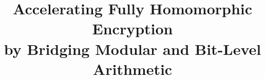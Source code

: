 







\title[Accelerating Fully Homomorphic Encryption by Bridging Modular and Bit-Level Arithmetic]
{Accelerating Fully Homomorphic Encryption\\by Bridging Modular and Bit-Level Arithmetic}



